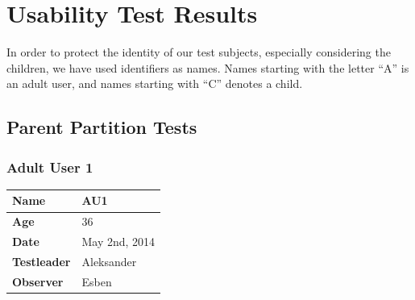 \section{Usability Test Results}
\label{sec:usabilityresults}
In order to protect the identity of our test subjects, especially considering the children, we have used identifiers as names. Names starting with the letter ``A'' is an adult user, and names starting with ``C'' denotes a child.

\subsection{Parent Partition Tests}

\subsubsection{Adult User 1}
\begin{table}[H]
\centering
\begin{tabular}{|p{4.0cm} | p{4.0cm} |}
	\hline
	\textbf{Name} & AU1\\
	\hline
	\textbf{Age} & 36 \\
	\hline
	\textbf{Date} & May 2nd, 2014 \\
	\hline
	\textbf{Testleader} & Aleksander\\
	\hline
	\textbf{Observer} & Esben\\
	\hline	
\end{tabular}
\end{table}

